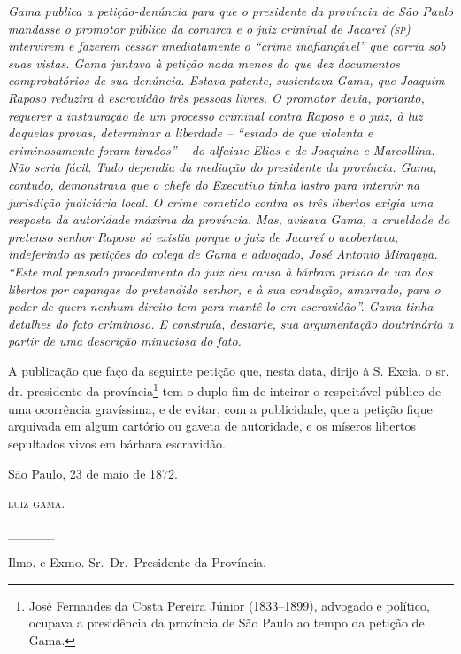 {\begin{flushright}
\begin{didascalia}
\emph{Gama publica a petição-denúncia para que o presidente da província
de São Paulo mandasse o promotor público da comarca e o juiz criminal de
Jacareí (\textsc{sp}) intervirem e fazerem cessar imediatamente o ``crime
inafiançável'' que corria sob suas vistas. Gama juntava à petição nada
menos do que dez documentos comprobatórios de sua denúncia. Estava
patente, sustentava Gama, que Joaquim Raposo reduzira à escravidão três
pessoas livres. O promotor devia, portanto, requerer a instauração de um
processo criminal contra Raposo e o juiz, à luz daquelas provas,
determinar a liberdade -- ``estado de que violenta e criminosamente foram
tirados'' -- do alfaiate Elias e de Joaquina e Marcollina. Não seria
fácil. Tudo dependia da mediação do presidente da província. Gama,
contudo, demonstrava que o chefe do Executivo tinha lastro para intervir
na jurisdição judiciária local. O crime cometido contra os três libertos
exigia uma resposta da autoridade máxima da província. Mas, avisava
Gama, a crueldade do pretenso senhor Raposo só existia porque o juiz de
Jacareí o acobertava, indeferindo as petições do colega de Gama e
advogado, José Antonio Miragaya. ``Este mal pensado procedimento do juiz
deu causa à bárbara prisão de um dos libertos por capangas do pretendido
senhor, e à sua condução, amarrado, para o poder de quem nenhum direito
tem para mantê-lo em escravidão''. Gama tinha detalhes do fato criminoso.
E construía, destarte, sua argumentação doutrinária a partir de uma
descrição minuciosa do fato.}
\end{didascalia}

A publicação que faço da seguinte petição que, nesta data, dirijo à S.
Excia. o sr. dr. presidente da província\footnote{ José Fernandes da
  Costa Pereira Júnior (1833--1899), advogado e político, ocupava a
  presidência da província de São Paulo ao tempo da petição de Gama.}
tem o duplo fim de inteirar o respeitável público de uma ocorrência
gravíssima, e de evitar, com a publicidade, que a petição fique
arquivada em algum cartório ou gaveta de autoridade, e os míseros
libertos sepultados vivos em bárbara escravidão.

São Paulo, 23 de maio de 1872.

\textsc{luiz gama}.

\_\_\_\_\_

Ilmo. e Exmo. Sr.~Dr.~Presidente da Província.


\end{flushright}}
